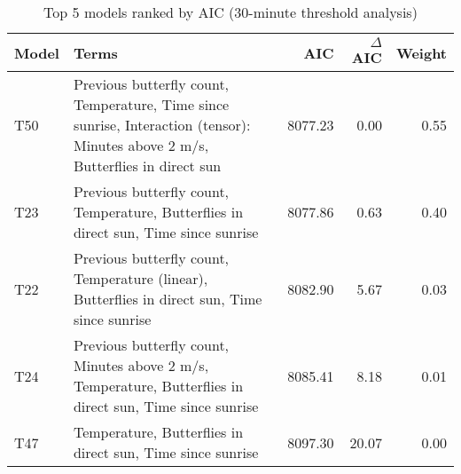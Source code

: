 \begin{table}

\caption{\label{tab:threshold_model_selection}Top 5 models ranked by AIC (30-minute threshold analysis)}
\centering
\begin{tabularx}{\textwidth}{lXrrr}
\toprule
Model & Terms & AIC & $\Delta$AIC & Weight\\
\midrule
T50 & Previous butterfly count, Temperature, Time since sunrise, Interaction (tensor): Minutes above 2 m/s, Butterflies in direct sun & 8077.23 & 0.00 & 0.55\\
T23 & Previous butterfly count, Temperature, Butterflies in direct sun, Time since sunrise & 8077.86 & 0.63 & 0.40\\
T22 & Previous butterfly count, Temperature (linear), Butterflies in direct sun, Time since sunrise & 8082.90 & 5.67 & 0.03\\
T24 & Previous butterfly count, Minutes above 2 m/s, Temperature, Butterflies in direct sun, Time since sunrise & 8085.41 & 8.18 & 0.01\\
T47 & Temperature, Butterflies in direct sun, Time since sunrise & 8097.30 & 20.07 & 0.00\\
\bottomrule
\end{tabularx}
\end{table}

